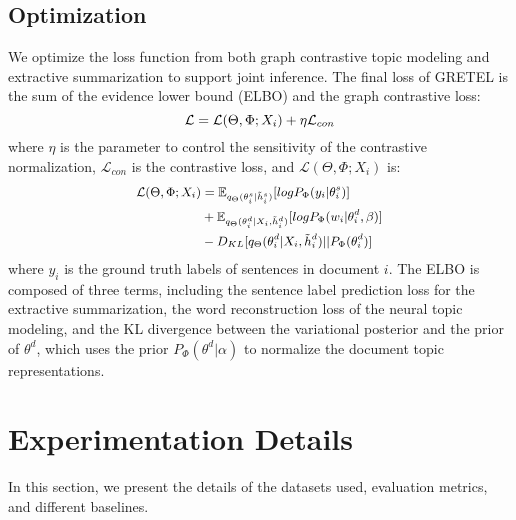 \documentclass[11pt]{article}
\begin{document}
\subsection{Optimization}
We optimize the loss function from both graph contrastive topic modeling and extractive summarization to support joint inference.
The final loss of GRETEL is the sum of the evidence lower bound (ELBO) and the graph contrastive loss:
\begin{equation}
\small
\mathcal{L} = \mathcal{L}(\Theta, \Phi; X_i) + \eta \mathcal{L}_{con}
\label{eq:10}
\end{equation}
where $\eta$ is the parameter to control the sensitivity of the contrastive normalization, $\mathcal{L}_{con}$ is the contrastive loss,
and $\mathcal{L}(\Theta, \Phi; X_i)$ is:
\begin{equation}
\small
\begin{split}
\mathcal{L}(\Theta, \Phi; X_i) &= \mathbb{E}_{q_{\Theta}(\theta_{i}^s|\tilde{h}^s_{i})}[log P_{\Phi}(y_i|\theta_{i}^s)]\\
&+\mathbb{E}_{q_{\Theta}(\theta^d_i|X_i,\tilde{h}^d_i)}[log P_{\Phi}(w_i|\theta^d_i,\beta)]\\
&-D_{KL}[q_{\Theta}(\theta^d_i|X_i,\tilde{h}^d_i)||P_{\Phi}(\theta^d_i)]
\label{eq:8}
\end{split}
\end{equation}
where $y_i$ is the ground truth labels of sentences in document $i$.
The ELBO is composed of three terms, including the sentence label prediction loss for the extractive summarization, the word reconstruction loss of the neural topic modeling,
and the KL divergence between the variational posterior and the prior of $\theta^d$, which uses the prior $P_{\Phi}(\theta^d|\alpha)$ to normalize the document topic representations. 


\section{Experimentation Details} 
In this section, we present the details of the datasets used, evaluation metrics, and different baselines.
\end{document}
